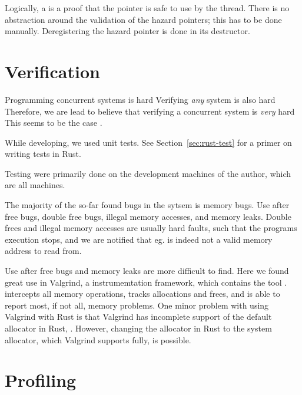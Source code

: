 \documentclass[b5paper]{report}
\begin{document}
Logically, a  is a proof that the pointer is safe to use by the
thread. There is no abstraction around the validation of the hazard pointers;
this has to be done manually. Deregistering the hazard pointer is done in its
destructor.






\section{Verification}
Programming concurrent systems is hard Verifying \emph{any} system is also
hard Therefore, we are lead to believe that verifying a concurrent system is
\emph{very} hard This seems to be the case .

While developing, we used unit tests. See Section~\ref{sec:rust-test} for a
primer on writing tests in Rust.

Testing were primarily done on the development machines of the author, which are
all  machines. 

The majority of the so-far found bugs in the sytsem is memory bugs. Use after
free bugs, double free bugs, illegal memory accesses, and memory leaks. Double
frees and illegal memory accesses are usually hard faults, such that the
programs execution stops, and we are notified that eg.  is indeed not
a valid memory address to read from.

Use after free bugs and memory leaks are more difficult to find. Here we found
great use in Valgrind\cite{valgrind}, a instrumemtation framework, which
contains the tool .  intercepts all memory
operations, tracks allocations and frees, and is able to report most, if not
all, memory problems. One minor problem with using Valgrind with Rust is that
Valgrind has incomplete support of the default allocator in Rust,
\cite{jemalloc}. However, changing the allocator in Rust to the system
allocator, which Valgrind supports fully, is possible.



\section{Profiling}
\end{document}

